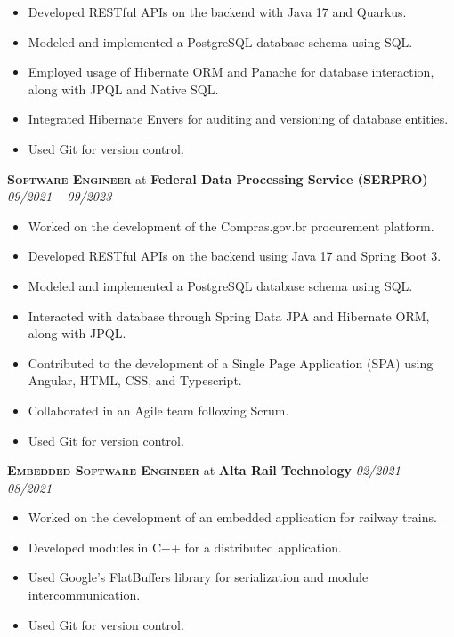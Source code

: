 \documentclass[a4paper,12pt]{article}
\begin{document}
{\small
\begin{itemize}[leftmargin=*]
    \setlength\itemsep{-0.2em}
    \item Developed RESTful APIs on the backend with Java 17 and Quarkus.
    \item Modeled and implemented a PostgreSQL database schema using SQL.
    \item Employed usage of Hibernate ORM and Panache for database interaction, along with JPQL and Native SQL.
    \item Integrated Hibernate Envers for auditing and versioning of database entities.
    \item Used Git for version control.
\end{itemize}
}

{\large\textbf{\textsc{Software Engineer}}} at \textbf{Federal Data Processing Service (SERPRO)} \hfill \textit{09/2021 -- 09/2023}

{\small
\begin{itemize}[leftmargin=*]
    \setlength\itemsep{-0.2em}
    \item Worked on the development of the Compras.gov.br procurement platform.
    \item Developed RESTful APIs on the backend using Java 17 and Spring Boot 3.
    \item Modeled and implemented a PostgreSQL database schema using SQL.
    \item Interacted with database through Spring Data JPA and Hibernate ORM, along with JPQL.
    \item Contributed to the development of a Single Page Application (SPA) using Angular, HTML, CSS, and Typescript.
    \item Collaborated in an Agile team following Scrum.
    \item Used Git for version control.
\end{itemize}
}

{\large\textbf{\textsc{Embedded Software Engineer}}} at \textbf{Alta Rail Technology} \hfill \textit{02/2021 -- 08/2021}

{\small
\begin{itemize}[leftmargin=*]
    \setlength\itemsep{-0.2em}
    \item Worked on the development of an embedded application for railway trains.
    \item Developed modules in C++ for a distributed application.
    \item Used Google's FlatBuffers library for serialization and module intercommunication.
    \item Used Git for version control.
\end{itemize}
}
\end{document}
